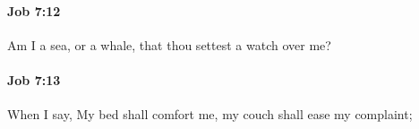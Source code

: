 		\paragraph{Job 7:12} %
			\label{JOB-7-12}

			Am I a sea, or a whale, that thou settest a watch over me?


		\paragraph{Job 7:13} %
			\label{JOB-7-13}

			When I say, My bed shall comfort me, my couch shall ease my complaint;


